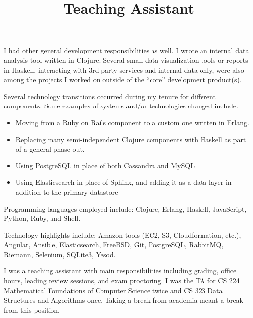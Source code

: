 \documentclass[margintitle,line]{res}
\begin{document}
\begin{resume}
\begin{position}

  I had other general development responsibilities as well. I wrote an
  internal data analysis tool written in Clojure. Several small data visualization
  tools or reports in Haskell, interacting with 3rd-party services and internal
  data only, were also among the projects I worked on outside of the ``core''
  development product(s).


  Several technology transitions occurred during my tenure for different components.
  Some examples of systems and/or technologies changed include:
  \begin{itemize}
    \item{Moving from a Ruby on Rails component to a custom one written in Erlang.}
    \item{Replacing many semi-independent Clojure components with Haskell
      as part of a general phase out.}
    \item{Using PostgreSQL in place of both Cassandra and MySQL}
    \item{Using Elasticsearch in place of Sphinx, and adding it as a data layer
      in addition to the primary datastore}
  \end{itemize}

  Programming languages employed include:
  Clojure, Erlang, Haskell, JavaScript, Python, Ruby, and Shell.

  Technology highlights include: Amazon tools (EC2, S3, Cloudformation, etc.),
  Angular, Ansible, Elasticsearch, FreeBSD, Git, PostgreSQL, RabbitMQ, Riemann,
  Selenium, SQLite3, Yesod.
\end{position}

\title{Teaching Assistant}
\begin{position}
 I was a teaching assistant with main responsibilities including
 grading, office hours, leading review sessions, and exam
 proctoring. I was the TA for CS 224 Mathematical Foundations of
 Computer Science twice and CS 323 Data Structures and Algorithms
 once. Taking a break from academia meant a break from this position.
\end{position}


\end{resume}
\end{document}
